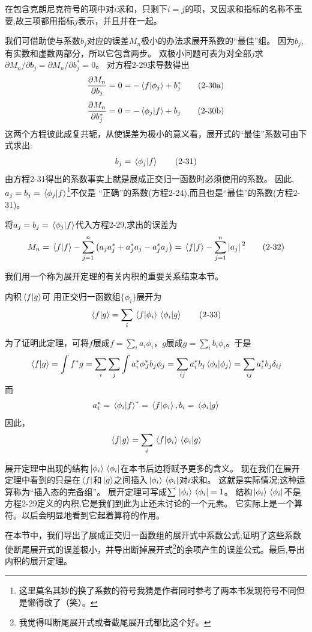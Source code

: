 在包含克朗尼克符号的项中对$i$求和，只剩下$i=j$的项，又因求和指标的名称不重要,故三项都用指标$j$表示，并且并在一起。

我们可借助使与系数$b_j$对应的误差$M_n$极小的办法求展开系数的“最佳”组。
因为$b_j$,有实数和虚数两部分，所以它包含两步。
双极小问题可表为对全部$j$求$\partial M_n / \partial b_j=\partial M_n / \partial b_j^*=0$。
对方程2-29求导数得出
\[\frac{\partial M_n}{\partial b_j}=0=-\bra*{f}\ket*{\phi_j}+b^*_j \tag{2-30a}\]
\[\frac{\partial M_n}{\partial b_j^*}=0=-\bra*{\phi_j}\ket*{f}+b_j \tag{2-30b}\]
这两个方程彼此成复共轭，从使误差为极小的意义看，展开式的“最佳”系数可由下式求出:
\[b_j=\bra*{\phi_j}\ket*{f} \tag{2-31}\]
由方程2-31得出的系数事实上就是展成正交归一函数时必须使用的系数。
因此,$a_j=b_j=\bra*{\phi_j}\ket*{f}$\footnote{这里莫名其妙的换了系数的符号我猜是作者同时参考了两本书发现符号不同但是懒得改了（笑）。}不仅是 “正确”的系数(方程2-24),而且也是“最佳”的系数(方程2-31)。

将$a_j=b_j=\bra*{\phi_j}\ket*{f}$代入方程2-29,求出的误差为
\[M_n=\bra*{f}\ket*{f}-\sum_{j=1}^n \left ( a_ja_j^*+a_j^*a_j-a_j^*a_j \right )=\bra*{f}\ket*{f}-\sum_{j=1}^n\abs*{a_j}^2 \tag{2-32}\]

我们用一个称为展开定理的有关内积的重要关系结束本节。

\begin{theorem}
    内积$\bra*{f}\ket*{g}$可 用正交归一函数组$\{\phi_i\}$展开为
    \[\bra*{f}\ket*{g}=\sum_i\bra*{f}\ket*{\phi_i}\bra*{\phi_i}\ket*{g} \tag{2-33}\]
\end{theorem}

为了证明此定理，可将$f$展成$f=\sum_ia_i\phi_i$，$g$展成$g=\sum_ib_i\phi_i$。于是
\[\bra*{f}\ket*{g}=\int f^*g=\sum_i\sum_j\int a^*_i\phi_J^*b_j\phi_j=\sum_{ij}a_i^*b_j\bra*{\phi_i}\ket*{\phi_j}=\sum_{ij}a_i^*b_j\delta_{ij}\]
而
\[a_i^*=\bra*{\phi_i}\ket*{f}^*=\bra*{f}\ket*{\phi_i},b_i=\bra*{\phi_i}\ket*{g}\]
因此，
\[\bra*{f}\ket*{g}=\sum_i\bra*{f}\ket*{\phi_i}\bra*{\phi_i}\ket*{g}\]

展开定理中出现的结构$\ket*{\phi_i}\bra*{\phi_i}$在本书后边将赋予更多的含义。
现在我们在展开定理中看到的只是在$\bra*{f}$和$\ket*{g}$之间插入$\ket*{\phi_i}\bra*{\phi_i}$对$i$求和。
这就是实际情况;这种运算称为“插入态的完备组”。
展开定理可写成$\sum\ket*{\phi_i}\bra*{\phi_i}=1$。
结构$\ket*{\phi_i}\bra*{\phi_i}$不是方程2-29定义的内积,它是我们到此为止还未讨论的一个元素。
它实际上是一个算符。以后会明显地看到它起着算符的作用。

在本节中，我们导出了展成正交归一函数组的展开式中系数公式;证明了这些系数使断尾展开式的误差极小，并导出断掉展开式\footnote{我觉得叫断尾展开式或者截尾展开式都比这个好。}的余项产生的误差公式。最后,导出内积的展开定理。

